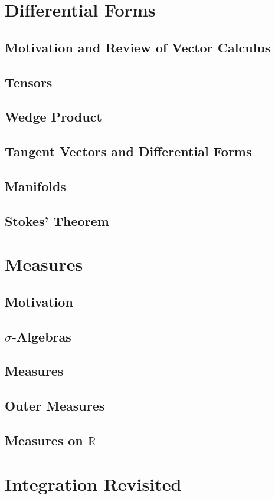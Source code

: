 \documentclass{article}
\newcommand{\R}{\mathbb{R}}
\theoremstyle{definition}
\begin{document}
\section{Differential Forms}
\subsection{Motivation and Review of Vector Calculus}
\subsection{Tensors}
\subsection{Wedge Product}
\subsection{Tangent Vectors and Differential Forms}
\subsection{Manifolds}
\subsection{Stokes' Theorem}
\section{Measures}
\subsection{Motivation}
\subsection{$ \sigma $-Algebras}
\subsection{Measures}
\subsection{Outer Measures}
\subsection{Measures on $ \R $}
\section{Integration Revisited}
\end{document}
